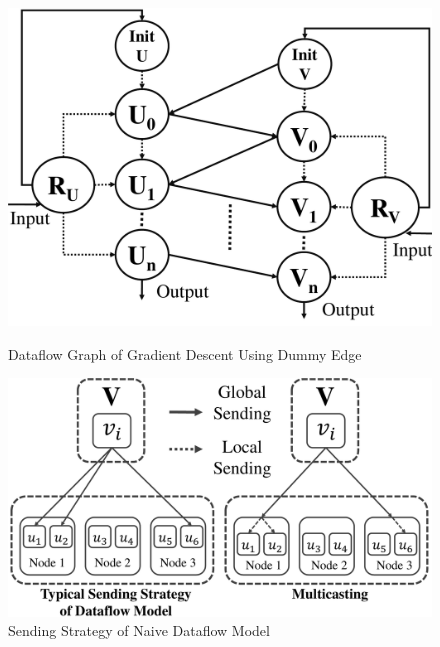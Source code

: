 \documentclass{llncs}
\begin{document}
\begin{figure}[h]
\begin{minipage}[t]{0.45\linewidth}
\centering
\includegraphics[width=\textwidth]{pics/DDCF.pdf}
\vspace{-20pt}
\caption{Dataflow Graph of Gradient Descent Using Dummy Edge \label{fig:DDCF}}
\end{minipage}
\hfill
\begin{minipage}[t]{0.5\linewidth}
\centering
\includegraphics[width=\textwidth]{pics/multicasting.pdf}
\vspace{-20pt}
\caption{Sending Strategy of Naive Dataflow Model \label{fig:multicasting}}
\end{minipage}
\vspace{-15pt}
\end{figure}

\vspace{-20pt}
\end{document}
